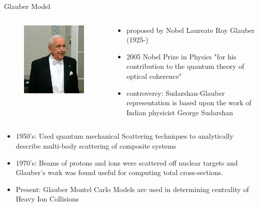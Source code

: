\documentclass{beamer}
\begin{document}
\begin{frame}{Glauber Model}
	\begin{columns}
	\begin{column}{.3\textwidth}
	\begin{figure}
	  \includegraphics[width=\textwidth]{plots/Roy_Glauber_Dec_10_2005.jpg}
	\end{figure}
	\end{column}
	\begin{column}{.7\textwidth}
	  \begin{itemize}
	    \item proposed by Nobel Laureate Roy Glauber (1925-)
	    \item 2005 Nobel Prize in Physics "for his contribution to the quantum theory of optical coherence"
	    \item controversy: Sudarshan-Glauber representation is based upon the work of Indian physicist George Sudarshan
	  \end{itemize}
	\end{column}
	\end{columns}
	\begin{itemize}
	  \item 1950's: Used quantum mechanical Scattering techniques to analytically describe multi-body scattering of composite systems
	  \item 1970's: Beams of protons and ions were scattered off nuclear targets and Glauber's work was found useful for computing total cross-sections.
	  \item Present: Glauber Montel Carlo Models are used in determining centrality of Heavy Ion Collisions
	\end{itemize}
\end{frame}
\end{document}
